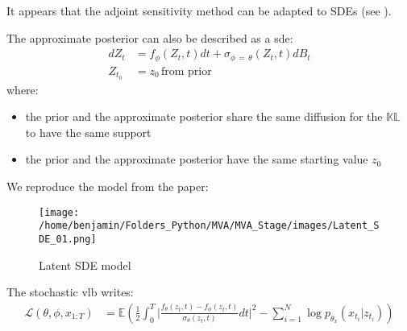 It appears that the adjoint sensitivity method can be adapted to SDEs (see \cite{li_scalable_2020}).

The approximate posterior can also be described as a \gls{sde}:
\begin{align}
    dZ_t &= f_{\phi}(Z_t,t)dt + \sigma_{\phi \, = \, \theta}(Z_t,t)dB_t \\
    Z_{t_0} &= z_0 \, \text{from prior}
\end{align}
where:
\begin{itemize}
    \item the prior and the approximate posterior share the same diffusion for the $\mathbb{KL}$ to have the same support
    \item the prior and the approximate posterior have the same starting value $z_0$
\end{itemize}

We reproduce the model from the paper:

\begin{figure}[H]
    \centering
    \texttt{[image: /home/benjamin/Folders\_Python/MVA/MVA\_Stage/images/Latent\_SDE\_01.png]}
    \caption{Latent SDE model}
    \label{fig:Latent SDE}
\end{figure}

The stochastic \gls{vlb} writes:
\begin{align}
    \mathcal{L}(\theta, \phi, x_{1:T}) &= \mathbb{E} \left(
        \frac{1}{2}\int_{0}^{T} \vert \frac{f_{\theta}(z_t,t) - f_{\phi}(z_t,t)}{\sigma_{\theta}(z_t,t)}dt \vert^{2} - 
        \sum_{i=1}^{N} \log{p_{\theta_x}}(x_{t_i} \vert z_{t_i})
        \right)
\end{align}
